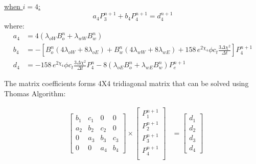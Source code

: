\documentclass[12pt,letterpaper,titlepage]{article}
\begin{document}
\underline{when $i=4$:}\\
\begin{equation*}
a_4 P^{n+1}_{3}+b_4 P^{n+1}_{4}=d^{n+1}_4
\end{equation*}
where:
\begin{align*}
a_4 &=4(\lambda_{oW}B_o^n+\lambda_{wW}B_w^n)\\
b_4 &=-\left[B_o^n(4\lambda_{oW}+8\lambda_{oE})+B_w^n(4\lambda_{wW}+8\lambda_{wE})+158\,e^{2\chi_4}\phi c_t \frac{3\Delta\chi^2}{\Delta t}\right]P_4^{n+1}\\
d_4 &=-158\,e^{2\chi_4}\phi c_t \frac{3\Delta\chi^2}{\Delta t}P_4^n- 8(\lambda_{oE}B_o^n+\lambda_{wE}B_w^n)P_{e}^{n+1}
\end{align*}

The matrix coefficients forms 4X4  tridiagonal matrix that can be solved using Thomas Algorithm:



\renewcommand{\arraystretch}{2}
 \[ \begin{aligned}
    & \begin{bmatrix} 
     b_1 & c_1 & 0 & 0 \\ 
     a_2 & b_2 & c_2 & 0 \\
        0 &  a_3 & b_3 & c_3 \\
       0&0&a_4& b_4
 \end{bmatrix} 
  \times \begin{bmatrix} 
      P^{n+1}_1        \\ 
      P^{n+1}_2        \\ 
      P^{n+1}_3        \\ 
      P^{n+1}_4        \\ 
    \end{bmatrix} &= \left[\begin{array}{l}  d_1\\d_2\\d_3\\d_4  \end{array}\right]
\end{aligned}  \] 
\end{document}
